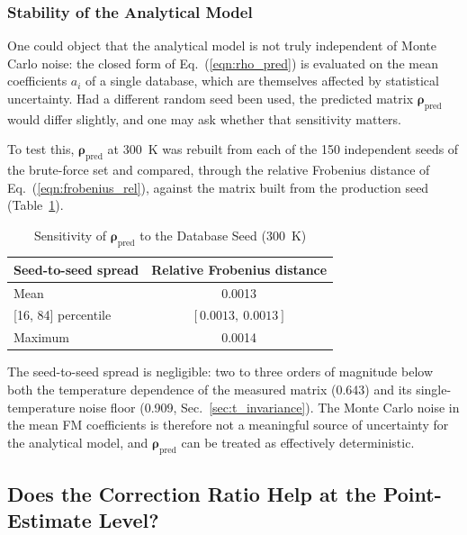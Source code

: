 \documentclass{style/nseJournal}
\begin{document}
\subsubsection{Stability of the Analytical Model}
\label{sec:stability_of_analytic_model}

One could object that the analytical model is not truly independent of Monte Carlo noise: the closed form of Eq.~(\ref{eqn:rho_pred}) is evaluated on the mean coefficients $a_i$ of a single database, which are themselves affected by statistical uncertainty. Had a different random seed been used, the predicted matrix $\boldsymbol\rho_{\text{pred}}$ would differ slightly, and one may ask whether that sensitivity matters.

To test this, $\boldsymbol\rho_{\text{pred}}$ at 300~K was rebuilt from each of the 150 independent seeds of the brute-force set and compared, through the relative Frobenius distance of Eq.~(\ref{eqn:frobenius_rel}), against the matrix built from the production seed (Table~\ref{tab:rho_pred_stability}).

\begin{table}[h]
\centering
\caption{Sensitivity of $\boldsymbol\rho_{\text{pred}}$ to the Database Seed (300~K)}
\label{tab:rho_pred_stability}
\begin{tabular}{lc}
\hline
Seed-to-seed spread & Relative Frobenius distance \\ \hline
Mean & 0.0013 \\
{}[16, 84] percentile & $[0.0013,\ 0.0013]$ \\
Maximum & 0.0014 \\ \hline
\end{tabular}
\end{table}

The seed-to-seed spread is negligible: two to three orders of magnitude below both the temperature dependence of the measured matrix (0.643) and its single-temperature noise floor (0.909, Sec.~\ref{sec:t_invariance}). The Monte Carlo noise in the mean FM coefficients is therefore not a meaningful source of uncertainty for the analytical model, and $\boldsymbol\rho_{\text{pred}}$ can be treated as effectively deterministic.


\subsection{Does the Correction Ratio Help at the Point-Estimate Level?}
\label{sec:res_raw_vs_corrected}
\end{document}

